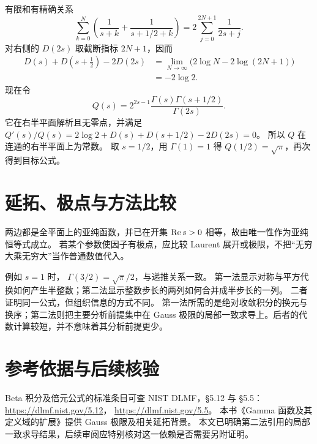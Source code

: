 \documentclass[UTF8,fontset=fandol,11pt]{ctexart}
\begin{document}
有限和有精确关系
\[
 \sum_{k=0}^{N}\left(\frac1{s+k}+\frac1{s+1/2+k}\right)
 =2\sum_{j=0}^{2N+1}\frac1{2s+j}.
\]
对右侧的 $D(2s)$ 取截断指标 $2N+1$，因而
\begin{align*}
 D(s)+D(s+\tfrac12)-2D(2s)
 &=\lim_{N\to\infty}\bigl(2\log N-2\log(2N+1)\bigr)\\
 &=-2\log2.
\end{align*}
现在令
\[
 Q(s)=2^{2s-1}\frac{\Gamma(s)\Gamma(s+1/2)}{\Gamma(2s)}.
\]
它在右半平面解析且无零点，并满足
$Q'(s)/Q(s)=2\log2+D(s)+D(s+1/2)-2D(2s)=0$。
所以 $Q$ 在连通的右半平面上为常数。
取 $s=1/2$，用 $\Gamma(1)=1$ 得 $Q(1/2)=\sqrt\pi$，再次得到目标公式。

\section{延拓、极点与方法比较}
两边都是全平面上的亚纯函数，并已在开集 $\operatorname{Re} s>0$ 相等，故由唯一性作为亚纯恒等式成立。
若某个参数使因子有极点，应比较 Laurent 展开或极限，不把“无穷大乘无穷大”当作普通数值代入。

例如 $s=1$ 时，
$\Gamma(3/2)=\sqrt\pi/2$，与递推关系一致。
第一法显示对称与平方代换如何产生半整数；第二法显示整数步长的两列如何合并成半步长的一列。
二者证明同一公式，但组织信息的方式不同。
第一法所需的是绝对收敛积分的换元与换序；第二法则把主要分析前提集中在
Gauss 极限的局部一致求导上。后者的代数计算较短，并不意味着其分析前提更少。

\section*{参考依据与后续核验}
Beta 积分及倍元公式的标准条目可查 NIST DLMF，§5.12 与 §5.5：
\url{https://dlmf.nist.gov/5.12}，
\url{https://dlmf.nist.gov/5.5}。
本书《Gamma 函数及其定义域的扩展》提供 Gauss 极限及相关延拓背景。
本文已明确第二法引用的局部一致求导结果，后续审阅应特别核对这一依赖是否需要另附证明。
\end{document}
